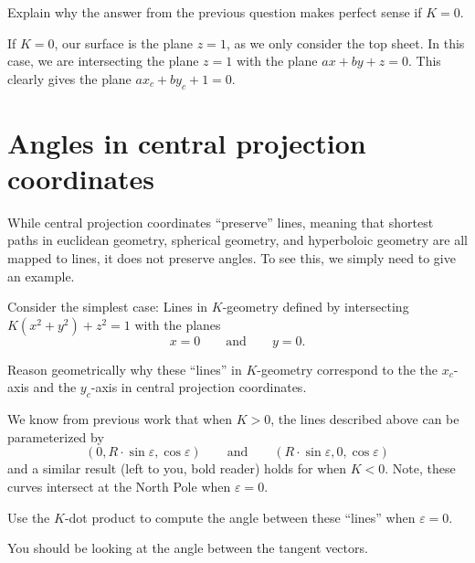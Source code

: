 \documentclass{ximera}
\begin{document}
\begin{problem}
  Explain why the answer from the previous question makes perfect sense if $K=0$.
  \begin{freeResponse}
    If $K=0$, our surface is the plane $z=1$, as we only consider the
    top sheet. In this case, we are intersecting the plane $z=1$ with
    the plane $ax+by+z=0$. This clearly gives the plane $ax_c+ by_c +
    1 = 0.$
  \end{freeResponse}
\end{problem}



\section{Angles in central projection coordinates}

While central projection coordinates ``preserve'' lines, meaning that
shortest paths in euclidean geometry, spherical geometry, and
hyperboloic geometry are all mapped to lines, it does not preserve
angles. To see this, we simply need to give an example.


Consider the simplest case: Lines in $K$-geometry defined by
intersecting $K\left(x^2+y^2\right) + z^2 = 1$ with the planes
\[
x=0 \qquad\text{and}\qquad y=0.
\]

\begin{problem}
  Reason geometrically why these ``lines'' in $K$-geometry correspond
  to the the $x_c$-axis and the $y_c$-axis in central projection
  coordinates.
\end{problem}

We know from previous work that when $K>0$, the lines described above
can be parameterized by
\[
(0, R\cdot \sin\varepsilon,\cos\varepsilon)\qquad\text{and}\qquad(R\cdot \sin\varepsilon, 0, \cos\varepsilon)
\]
and a similar result (left to you, bold reader) holds for when
$K<0$. Note, these curves intersect at the North Pole when
$\varepsilon =0$.

\begin{problem}
  Use the $K$-dot product to compute the angle between these ``lines'' when $\varepsilon=0$.
  \begin{hint}
    You should be looking at the angle between the tangent vectors.
  \end{hint}
\end{problem}
\end{document}
